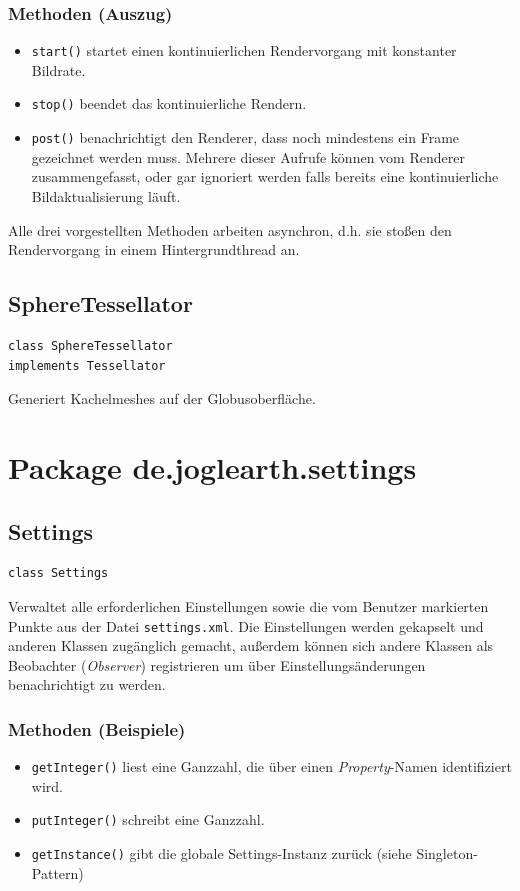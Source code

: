 \documentclass[10pt]{scrreprt}
\begin{document}
\subsubsection*{Methoden (Auszug)}
\begin{itemize}
\item \texttt{start()} startet einen kontinuierlichen Rendervorgang mit konstanter Bildrate.
\item \texttt{stop()} beendet das kontinuierliche Rendern.
\item \texttt{post()} benachrichtigt den Renderer, dass noch mindestens ein Frame gezeichnet werden muss. Mehrere dieser Aufrufe können vom Renderer zusammengefasst, oder gar ignoriert werden falls bereits eine kontinuierliche Bildaktualisierung läuft.
\end{itemize}
Alle drei vorgestellten Methoden arbeiten asynchron, d.h. sie stoßen den Rendervorgang in einem Hintergrundthread an.

\vspace{5mm}
\subsection*{SphereTessellator}
\begin{lstlisting}
class SphereTessellator
implements Tessellator
\end{lstlisting}
Generiert Kachelmeshes auf der Globusoberfläche.\\




\vspace{5mm}
\section{Package de.joglearth.settings}
\subsection*{Settings}
\begin{lstlisting}
class Settings
\end{lstlisting}
Verwaltet alle erforderlichen Einstellungen sowie die vom Benutzer markierten Punkte aus der Datei \texttt{settings.xml}. Die Einstellungen werden gekapselt und anderen Klassen zugänglich gemacht, außerdem können sich andere Klassen als Beobachter (\textit{Observer}) registrieren um über Einstellungsänderungen benachrichtigt zu werden.\\
\subsubsection*{Methoden (Beispiele)}
\begin{itemize}
\item \texttt{getInteger()} liest eine Ganzzahl, die über einen \textit{Property}-Namen identifiziert wird.
\item \texttt{putInteger()} schreibt eine Ganzzahl.
\item \texttt{getInstance()} gibt die globale Settings-Instanz zurück (siehe Singleton-Pattern)
\end{itemize}
\end{document}
